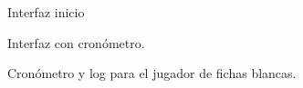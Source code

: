 \documentclass[conference]{IEEEtran}
\begin{document}
\begin{figure}[ht]
        \caption{Interfaz inicio}
        \label{interfazInicio}
    \end{figure}
    
    \begin{figure}[ht]
        \caption{Interfaz con cronómetro.}
        \label{InterfazCompleta}
    \end{figure}
    
    \newline
    
    \begin{figure}[ht]
        \caption{Cronómetro y log para el jugador de fichas blancas.}
        \label{figcronometro y log}
    \end{figure}
    
\end{document}
